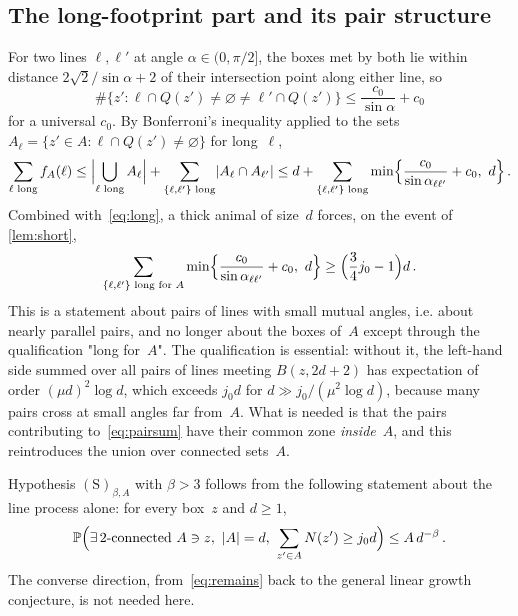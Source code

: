 \documentclass[11pt,letterpaper]{article}
\begin{document}
\subsection{The long-footprint part and its pair structure}
\label{sec:long}

For two lines $\ell,\ell'$ at angle $\alpha\in(0,\pi/2]$, the boxes met by both lie within distance $2\sqrt2/\sin\alpha+2$ of their intersection point along either line, so
\begin{equation}
\label{eq:pair}
  \#\{z'\colon\ell\cap Q(z')\neq\varnothing\neq\ell'\cap Q(z')\}\le\frac{c_0}{\sin\alpha}+c_0
\end{equation}
for a universal $c_0$. By Bonferroni's inequality applied to the sets $A_\ell=\{z'\in A\colon\ell\cap Q(z')\neq\varnothing\}$ for long~$\ell$,
\begin{equation*}
  \sum_{\ell\text{ long}}f_A(\ell)\le\Bigl\lvert\bigcup_{\ell\text{ long}}A_\ell\Bigr\rvert+\sum_{\{\ell,\ell'\}\text{ long}}\lvert A_\ell\cap A_{\ell'}\rvert\le d+\sum_{\{\ell,\ell'\}\text{ long}}\min\Bigl\{\frac{c_0}{\sin\alpha_{\ell\ell'}}+c_0,\ d\Bigr\}\,.
\end{equation*}
Combined with~\eqref{eq:long}, a thick animal of size~$d$ forces, on the event of \cref{lem:short},
\begin{equation}
\label{eq:pairsum}
  \sum_{\{\ell,\ell'\}\text{ long for }A}\min\Bigl\{\frac{c_0}{\sin\alpha_{\ell\ell'}}+c_0,\ d\Bigr\}\ge\Bigl(\frac34j_0-1\Bigr)d\,.
\end{equation}
This is a statement about pairs of lines with small mutual angles, i.e. about nearly parallel pairs, and no longer about the boxes of~$A$ except through the qualification "long for~$A$". The qualification is essential: without it, the left-hand side summed over all pairs of lines meeting $B(z,2d+2)$ has expectation of order $(\mu d)^2\log d$, which exceeds $j_0d$ for $d\gg j_0/(\mu^2\log d)$, because many pairs cross at small angles far from~$A$. What is needed is that the pairs contributing to~\eqref{eq:pairsum} have their common zone \emph{inside}~$A$, and this reintroduces the union over connected sets~$A$.

\begin{proposition}
\label{prop:remains}
Hypothesis $\mathrm{(S)}_{\beta,A}$ with $\beta>3$ follows from the following statement about the line process alone: for every box~$z$ and $d\ge1$,
\begin{equation}
\label{eq:remains}
  \P\Bigl(\exists\,2\text{-connected }A\ni z,\ \lvert A\rvert=d,\ \sum_{z'\in A}N(z')\ge j_0d\Bigr)\le A\,d^{-\beta}\,.
\end{equation}
The converse direction, from~\eqref{eq:remains} back to the general linear growth conjecture, is not needed here.
\end{proposition}
\end{document}
